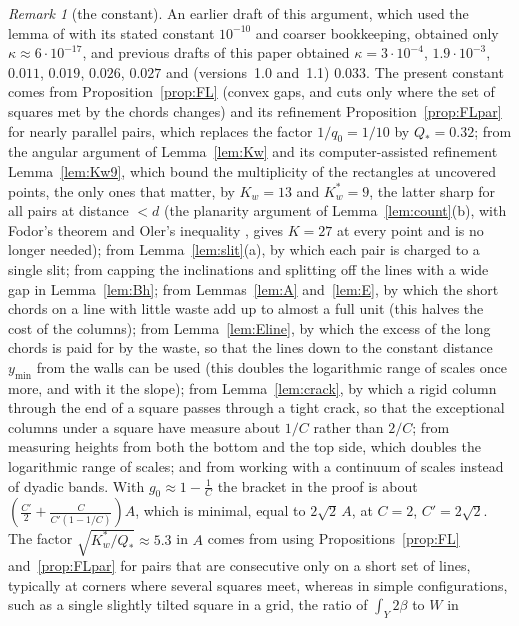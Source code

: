 \documentclass[11pt]{amsart}
\theoremstyle{definition}
\theoremstyle{remark}
\newtheorem{remark}[theorem]{Remark}
\begin{document}
\begin{remark}[the constant]\label{rem:const}
An earlier draft of this argument, which used the lemma of \cite{RV} with its stated constant
$10^{-10}$ and coarser bookkeeping, obtained only $\kappa\approx6\cdot10^{-17}$, and previous drafts of this paper
obtained $\kappa=3\cdot10^{-4}$, $1.9\cdot10^{-3}$, $0.011$, $0.019$, $0.026$, $0.027$ and (versions~1.0 and~1.1) $0.033$. The present constant comes from
Proposition~\ref{prop:FL} (convex gaps, and cuts only where the set of squares met by the chords changes) and its refinement
Proposition~\ref{prop:FLpar} for nearly parallel pairs, which replaces the factor $1/q_0=1/10$ by $Q_*=0.32$; from the angular argument
of Lemma~\ref{lem:Kw} and its computer-assisted refinement Lemma~\ref{lem:Kw9}, which bound the multiplicity of the rectangles at
uncovered points, the only ones that matter, by $K_w=13$ and $K_w^*=9$, the latter sharp for all pairs at distance $<d$ (the
planarity argument of Lemma~\ref{lem:count}(b), with Fodor's theorem \cite{Fod} and Oler's inequality \cite{Ole,FG}, gives $K=27$ at every
point and is no longer needed); from Lemma~\ref{lem:slit}(a), by which each pair is charged to a single slit;
from capping the inclinations and splitting off the lines with a wide gap in Lemma~\ref{lem:Bh}; from Lemmas~\ref{lem:A} and~\ref{lem:E}, by which the
short chords on a line with little waste add up to almost a full unit (this halves the cost of the columns); from
Lemma~\ref{lem:Eline}, by which the excess of the long chords is paid for by the waste, so that the lines down to the constant
distance $y_{\min}$ from the walls can be used (this doubles the logarithmic range of scales once more, and with it the slope); from
Lemma~\ref{lem:crack}, by which a rigid column through the end of a square passes through a tight crack, so that the exceptional
columns under a square have measure about $1/C$ rather than $2/C$; from measuring heights from both the bottom and the top side,
which doubles the logarithmic range of scales; and from working with a continuum of scales instead of dyadic bands. With
$g_0\approx1-\frac1C$ the bracket in the proof is about $(\frac{C'}2+\frac C{C'(1-1/C)})A$, which is minimal, equal to $2\sqrt2\,A$, at
$C=2$, $C'=2\sqrt2$. The factor $\sqrt{K_w^*/Q_*}\approx5.3$ in $A$ comes from using Propositions~\ref{prop:FL}
and~\ref{prop:FLpar} for pairs that are consecutive only on a short set of lines, typically at corners where several squares meet,
whereas in simple configurations, such as a single slightly tilted square in a grid, the ratio of $\int_Y2\beta$ to $W$ in

\end{remark}
\end{document}
